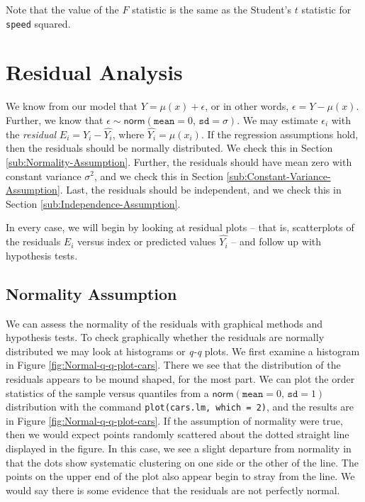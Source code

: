 \documentclass[captions=tableheading]{scrbook}
\begin{document}
Note that the value of the \(F\) statistic is the same as the Student's \(t\) statistic for \texttt{speed} squared.
\section{Residual Analysis}
\label{sec-1-4}

\label{sec:Residual-Analysis-SLR}

We know from our model that \(Y=\mu(x)+\epsilon\), or in other words, \(\epsilon=Y-\mu(x)\). Further, we know that \(\epsilon\sim\mathsf{norm}(\mathtt{mean}=0,\,\mathtt{sd}=\sigma)\). We may estimate \(\epsilon_{i}\) with the \emph{residual} \(E_{i}=Y_{i}-\hat{Y_{i}}\), where \(\hat{Y_{i}}=\hat{\mu}(x_{i})\). If the regression assumptions hold, then the residuals should be normally distributed. We check this in Section \ref{sub:Normality-Assumption}. Further, the residuals should have mean zero with constant variance \(\sigma^{2}\), and we check this in Section \ref{sub:Constant-Variance-Assumption}. Last, the residuals should be independent, and we check this in Section \ref{sub:Independence-Assumption}.

In every case, we will begin by looking at residual plots -- that is, scatterplots of the residuals \(E_{i}\) versus index or predicted values \(\hat{Y_{i}}\) -- and follow up with hypothesis tests.
\subsection{Normality Assumption}
\label{sec-1-4-1}

\label{sub:Normality-Assumption}

We can assess the normality of the residuals with graphical methods and hypothesis tests. To check graphically whether the residuals are normally distributed we may look at histograms or \emph{q-q} plots. We first examine a histogram in Figure \ref{fig:Normal-q-q-plot-cars}. There we see that the distribution of the residuals appears to be mound shaped, for the most part. We can plot the order statistics of the sample versus quantiles from a \(\mathsf{norm}(\mathtt{mean}=0,\,\mathtt{sd}=1)\) distribution with the command \texttt{plot(cars.lm, which = 2)}, and the results are in Figure \ref{fig:Normal-q-q-plot-cars}. If the assumption of normality were true, then we would expect points randomly scattered about the dotted straight line displayed in the figure. In this case, we see a slight departure from normality in that the dots show systematic clustering on one side or the other of the line. The points on the upper end of the plot also appear begin to stray from the line. We would say there is some evidence that the residuals are not perfectly normal. 
\end{document}
